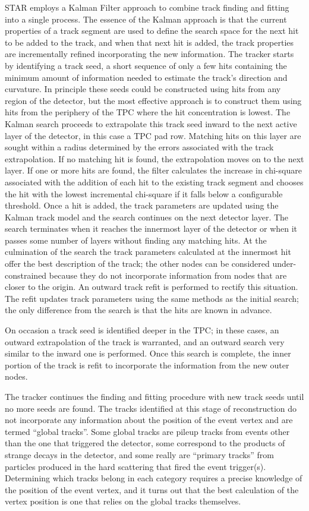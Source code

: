 STAR employs a Kalman Filter approach to combine track finding and fitting
into a single process. The essence of the Kalman approach is that the current
properties of a track segment are used to define the search space for the next
hit to be added to the track, and when that next hit is added, the track
properties are incrementally refined incorporating the new information. The
tracker starts by identifying a track seed, a short sequence of only a few
hits containing the minimum amount of information needed to estimate the
track's direction and curvature. In principle these seeds could be constructed
using hits from any region of the detector, but the most effective approach is
to construct them using hits from the periphery of the TPC where the hit
concentration is lowest. The Kalman search proceeds to extrapolate this track
seed inward to the next active layer of the detector, in this case a TPC pad
row. Matching hits on this layer are sought within a radius determined by the
errors associated with the track extrapolation. If no matching hit is found,
the extrapolation moves on to the next layer. If one or more hits are found,
the filter calculates the increase in chi-square associated with the addition
of each hit to the existing track segment and chooses the hit with the lowest
incremental chi-square if it falls below a configurable threshold. Once a hit
is added, the track parameters are updated using the Kalman track model and
the search continues on the next detector layer. The search terminates when it
reaches the innermost layer of the detector or when it passes some number of
layers without finding any matching hits. At the culmination of the search the
track parameters calculated at the innermost hit offer the best description of
the track; the other nodes can be considered under-constrained because they do
not incorporate information from nodes that are closer to the origin. An
outward track refit is performed to rectify this situation. The refit updates
track parameters using the same methods as the initial search; the only
difference from the search is that the hits are known in advance.

On occasion a track seed is identified deeper in the TPC; in these cases, an
outward extrapolation of the track is warranted, and an outward search very
similar to the inward one is performed. Once this search is complete, the
inner portion of the track is refit to incorporate the information from the
new outer nodes.

The tracker continues the finding and fitting procedure with new track seeds
until no more seeds are found. The tracks identified at this stage of
reconstruction do not incorporate any information about the position of the
event vertex and are termed ``global tracks''. Some global tracks are pileup
tracks from events other than the one that triggered the detector, some
correspond to the products of strange decays in the detector, and some really
are ``primary tracks'' from particles produced in the hard scattering that
fired the event trigger(s). Determining which tracks belong in each category
requires a precise knowledge of the position of the event vertex, and it turns
out that the best calculation of the vertex position is one that relies on the
global tracks themselves.

